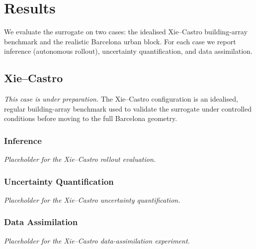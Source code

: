 \section{Results}
\label{sec:results}

We evaluate the surrogate on two cases: the idealised Xie--Castro building-array
benchmark and the realistic Barcelona urban block. For each case we report
inference (autonomous rollout), uncertainty quantification, and data
assimilation.

\subsection{Xie--Castro}
\label{sec:xie_castro}

\textit{This case is under preparation.} The Xie--Castro configuration is an
idealised, regular building-array benchmark used to validate the surrogate under
controlled conditions before moving to the full Barcelona geometry.

\subsubsection{Inference}
\label{sec:xc_inference}

\textit{Placeholder for the Xie--Castro rollout evaluation.}

\subsubsection{Uncertainty Quantification}
\label{sec:xc_uq}

\textit{Placeholder for the Xie--Castro uncertainty quantification.}

\subsubsection{Data Assimilation}
\label{sec:xc_da}

\textit{Placeholder for the Xie--Castro data-assimilation experiment.}

